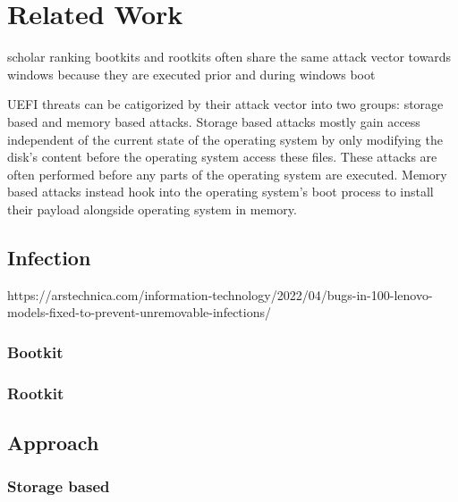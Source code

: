 
\chapter{Related Work}


scholar ranking
bootkits and rootkits often share the same attack vector towards windows because they are executed prior and during windows boot

UEFI threats can be catigorized by their attack vector into two groups: storage based and memory based attacks. Storage based attacks mostly gain access independent of the current state of the operating system by only modifying the disk's content before the operating system access these files. These attacks are often performed before any parts of the operating system are executed. Memory based attacks instead hook into the operating system's boot process to install their payload alongside operating system in memory.

\section{Infection}

https://arstechnica.com/information-technology/2022/04/bugs-in-100-lenovo-models-fixed-to-prevent-unremovable-infections/

\subsection{Bootkit}

\subsection{Rootkit}

\section{Approach}
\subsection{Storage based}

